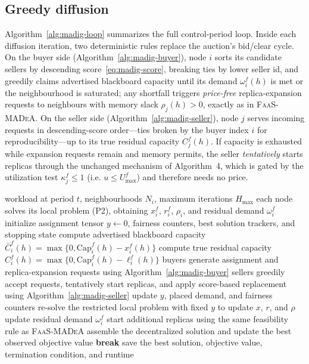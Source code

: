 \subsection{Greedy diffusion}
\label{sec:madig-greedy}

Algorithm~\ref{alg:madig-loop} summarizes the full control-period loop. Inside
each diffusion iteration, two deterministic rules replace the auction's
bid/clear cycle. On the buyer side (Algorithm~\ref{alg:madig-buyer}), node $i$
sorts its candidate sellers by descending score~\eqref{eq:madig-score}, breaking
ties by lower seller id, and greedily claims advertised
blackboard capacity until its demand $\omega_i^f(h)$ is met or the
neighbourhood is saturated; any
shortfall triggers \emph{price-free} replica-expansion requests to neighbours
with memory slack $\rho_j(h)>0$, exactly as in \textsc{FaaS-MADeA}. On the
seller side (Algorithm~\ref{alg:madig-seller}), node $j$ serves incoming
requests in descending-score order---ties broken by the buyer index $i$ for
reproducibility---up to its true residual capacity $C_j^f(h)$. If capacity is
exhausted while expansion requests remain and memory permits, the seller
\emph{tentatively} starts replicas through the unchanged mechanism of
Algorithm~4, which is gated by the utilization test $\kappa_j^f\le 1$ (i.e.
$u\le U^f_{\max}$) and therefore needs no price.

\begin{algorithm}
\caption{\textsc{FaaS-MADiG} --- control-period diffusion loop}
\label{alg:madig-loop}
\begin{algorithmic}[1]
\Require workload at period $t$, neighbourhoods $N_i$, maximum iterations $H_{\max}$
  \State each node solves its local problem (P2), obtaining $x_i^f$, $r_i^f$, $\rho_i$, and residual demand $\omega_i^f$
  \State initialize assignment tensor $y\gets 0$, fairness counters, best solution trackers, and stopping state
    \State compute advertised blackboard capacity $\bar C_i^f(h)=\max\{0,\mathrm{Cap}_i^f(h)-x_i^f(h)\}$
    \State compute true residual capacity $C_i^f(h)=\max\{0,\mathrm{Cap}_i^f(h)-\ell_i^f(h)\}$
    \State buyers generate assignment and replica-expansion requests using Algorithm~\ref{alg:madig-buyer}
      \State sellers greedily accept requests, tentatively start replicas, and apply score-based replacement using Algorithm~\ref{alg:madig-seller}
      \State update $y$, placed demand, and fairness counters
      \State re-solve the restricted local problem with fixed $y$ to update $x$, $r$, and $\rho$
      \State update residual demand $\omega_i^f$
    \Else
        \State start additional replicas using the same feasibility rule as \textsc{FaaS-MADeA}
      \EndIf
    \EndIf
    \State assemble the decentralized solution and update the best observed objective value
      \State \textbf{break}
    \EndIf
  \EndFor
  \State save the best solution, objective value, termination condition, and runtime
\EndFor
\end{algorithmic}
\end{algorithm}

